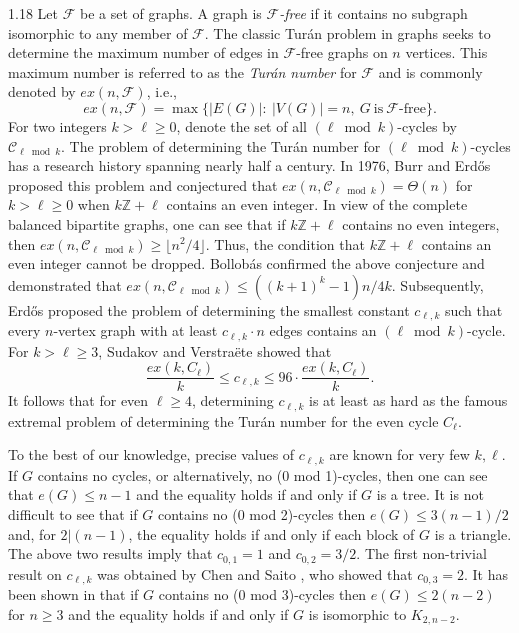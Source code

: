 \documentclass[10pt]{article}
\begin{document}
\begin{spacing}{1.18}
    Let $\mathcal{F}$ be a set of graphs. A graph is \textit{$\mathcal{F}$-free} if it contains no subgraph isomorphic to any member of $\mathcal{F}$. The classic Tur\'{a}n problem in graphs seeks to determine the maximum number of edges in $\mathcal{F}$-free graphs on $n$ vertices. This maximum number is referred to as the \textit{Tur\'{a}n number} for $\mathcal{F}$ and is commonly denoted by $ex(n,\mathcal{F})$, i.e.,
    \[
       ex(n,\mathcal{F})
       =\max \{|E(G)|:\ |V(G)|=n, ~G~\text{is}~\mathcal{F}\text{-free}\}.
    \]
    For two integers $k>\ell\geqslant 0$, denote the set of all $(\ell \bmod k)$-cycles by $\mathcal{C}_{\ell\bmod k}$. The problem of determining the Tur\'{a}n number for $(\ell \bmod k)$-cycles has a research history spanning nearly half a century. In 1976, Burr and Erd\H{o}s~\cite{Erd76} proposed this problem and conjectured that $ex(n,\mathcal{C}_{\ell \bmod k})=\varTheta(n)$ for $k>\ell\geqslant 0$ when $k\mathbb{Z}+\ell$ contains an even integer. In view of the complete balanced bipartite graphs, one can see that if $k\mathbb{Z}+\ell$ contains no even integers, then $ex(n,\mathcal{C}_{\ell \bmod k})\geqslant\lfloor n^2/4\rfloor$. Thus, the condition that $k\mathbb{Z}+\ell$ contains an even integer cannot be dropped. Bollob\'{a}s \cite{Bol77} confirmed the above conjecture and demonstrated that $ex(n,\mathcal{C}_{\ell \bmod k})\leqslant((k+1)^k-1)n/4k$. Subsequently, Erd\H{o}s proposed the problem of determining the smallest constant $c_{\ell,k}$ such that every $n$-vertex graph with at least $c_{\ell,k}\cdot n$ edges contains an $(\ell \bmod k)$-cycle. For $k>\ell\geqslant 3$, Sudakov and Verstra\"{e}te \cite{SV17} showed that 
    \[
       \frac{ex(k,C_{\ell})}{k}
       \leqslant c_{\ell,k}
       \leqslant 96\cdot \frac{ex(k,C_{\ell})}{k}.
    \]
    It follows that for even $\ell\geqslant 4$, determining $c_{\ell,k}$ is at least as hard as the famous extremal problem of determining the Tur\'{a}n number for the even cycle $C_{\ell}$. 

    To the best of our knowledge, precise values of $c_{\ell,k}$ are known for very few $k,\ell$. If $G$ contains no cycles, or alternatively, no (0 mod 1)-cycles, then one can see that $e(G)\leqslant n-1$ and the equality holds if and only if $G$ is a tree. It is not difficult to see that if $G$ contains no (0 mod 2)-cycles then $e(G)\leqslant 3(n-1)/2$ and, for $2|(n-1)$, the equality holds if and only if each block of $G$ is a triangle. The above two results imply that $c_{0,1}=1$ and $c_{0,2}=3/2$. The first non-trivial result on $c_{\ell,k}$ was obtained by Chen and Saito \cite{CS94}, who showed that $c_{0,3}=2$. It has been shown in \cite{CS94} that if $G$ contains no (0 mod 3)-cycles then $e(G)\leqslant 2(n-2)$ for $n \geqslant 3$ and the equality holds if and only if $G$ is isomorphic to $K_{2,n-2}$. 


\end{spacing}
\end{document}
